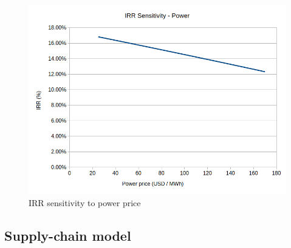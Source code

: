 \documentclass[a4paper, titlepage]{article}
\begin{document}
\begin{figure}
	\includegraphics[width=\textwidth]{img/fig_IRRsensitivity_power.png}
	\caption{IRR sensitivity to power price}
	\label{img_IRRsens_power}
\end{figure}

\subsection{Supply-chain model}













\printbibliography{}
\end{document}
